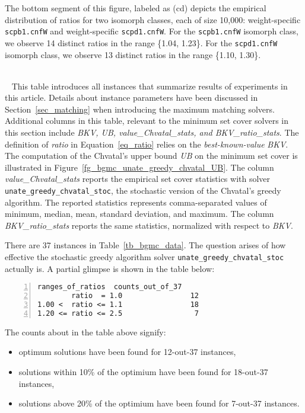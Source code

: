 \begin{description}
The bottom segment of this figure, labeled as {\sf (cd)}
depicts  the empirical distribution of ratios  
for two isomorph classes, each of size 10,000:
weight-specific {\tt scpb1.cnfW} and 
weight-specific {\tt scpd1.cnfW}.
For the {\tt scpb1.cnfW} isomorph class,
we observe  14 distinct ratios in the range \{1.04, 1.23\}.
For the {\tt scpd1.cnfW} isomorph  class,
we observe  13 distinct ratios in the range \{1.10, 1.30\}.

\item[\sf{Table~\ref{tb_bgmc_data}}]~\\\
This table
introduces all instances
that summarize results of experiments in this article.
Details about instance parameters have been discussed
in Section~\ref{sec_matching} when introducing
the maximum matching solvers.
Additional columns in this table, relevant to
the minimum set cover solvers  
in this section include
{\it BKV, UB, value\_Chvatal\_stats, and BKV\_ratio\_stats}.
The definition of {\it ratio} in Equation~\ref{eq_ratio}
relies on the {\it best-known-value} {\it BKV}. 
The computation of the Chvatal's upper bound 
{\it UB} on the minimum set cover is illustrated in
Figure~\ref{fg_bgmc_unate_greedy_chvatal_UB}.
The column {\it value\_Chvatal\_stats} reports the 
empirical set cover statistics with solver {\tt unate\_greedy\_chvatal\_stoc},
the stochastic version of the Chvatal's greedy algorithm.
The reported statistics represents comma-separated
values of minimum, median, mean, standard deviation, and maximum.
The column {\it  BKV\_ratio\_stats} reports
the same statistics, normalized with respect to {\it BKV}.

There are 37 instances in Table~\ref{tb_bgmc_data}.
The question arises of how effective 
the stochastic greedy algorithm solver
{\tt unate\_greedy\_chvatal\_stoc} 
actually is.
A partial glimpse is shown in the table below:

\par\vspace*{1.2ex}
\hspace*{0.8em}
\begin{minipage}{0.36\textwidth}
\begin{Verbatim}[frame=lines, fontsize=\footnotesize,numbers=left,
numbersep=3pt,firstline=1,xleftmargin=9mm]      
    ranges_of_ratios  counts_out_of_37     
        ratio  = 1.0                12                
1.00 <  ratio <= 1.1                18                
1.20 <= ratio <= 2.5                 7                 
\end{Verbatim}
\end{minipage}
\par\vspace*{1.1ex}\noindent
The counts about in the table above signify:
\begin{itemize}
\item
optimum solutions have been found for 12-out-37 instances, 
\item
solutions within 10\% of the optimium have been found for 18-out-37 instances,
\item
solutions above 20\% of the optimium have been found for 7-out-37 instances.
\end{itemize}


\end{description}
